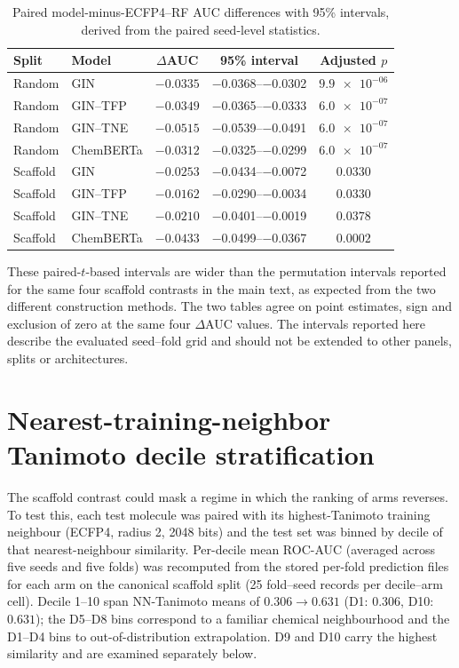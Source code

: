 \documentclass[11pt,a4paper]{article}
\begin{document}
\begin{table}[h]
\centering
\caption{Paired model-minus-ECFP4--RF AUC differences with 95\% intervals, derived from the paired seed-level statistics.}
\label{tab:s4_paired_ci}
\begin{tabular}{llccc}
\toprule
Split & Model & $\Delta$AUC & 95\% interval & Adjusted $p$ \\
\midrule
Random & GIN & $-\num{0.0335}$ & \numrange{-0.0368}{-0.0302} & $\num{9.9e-06}$ \\
Random & GIN--TFP & $-\num{0.0349}$ & \numrange{-0.0365}{-0.0333} & $\num{6.0e-07}$ \\
Random & GIN--TNE & $-\num{0.0515}$ & \numrange{-0.0539}{-0.0491} & $\num{6.0e-07}$ \\
Random & ChemBERTa & $-\num{0.0312}$ & \numrange{-0.0325}{-0.0299} & $\num{6.0e-07}$ \\
Scaffold & GIN & $-\num{0.0253}$ & \numrange{-0.0434}{-0.0072} & $\num{0.0330}$ \\
Scaffold & GIN--TFP & $-\num{0.0162}$ & \numrange{-0.0290}{-0.0034} & $\num{0.0330}$ \\
Scaffold & GIN--TNE & $-\num{0.0210}$ & \numrange{-0.0401}{-0.0019} & $\num{0.0378}$ \\
Scaffold & ChemBERTa & $-\num{0.0433}$ & \numrange{-0.0499}{-0.0367} & $\num{0.0002}$ \\
\bottomrule
\end{tabular}
\end{table}

These paired-$t$-based intervals are wider than the permutation intervals reported for the same four scaffold contrasts in the main text, as expected from the two different construction methods. The two tables agree on point estimates, sign and exclusion of zero at the same four $\Delta$AUC values. The intervals reported here describe the evaluated seed--fold grid and should not be extended to other panels, splits or architectures.

\section{Nearest-training-neighbor Tanimoto decile stratification}
\label{sec:nn_deciles_si}

The scaffold contrast could mask a regime in which the ranking of arms reverses. To test this, each test molecule was paired with its highest-Tanimoto training neighbour (ECFP4, radius \num{2}, \num{2048} bits) and the test set was binned by decile of that nearest-neighbour similarity. Per-decile mean ROC-AUC (averaged across five seeds and five folds) was recomputed from the stored per-fold prediction files for each arm on the canonical scaffold split (\num{25} fold--seed records per decile--arm cell). Decile \numrange{1}{10} span NN-Tanimoto means of $\num{0.306} \to \num{0.631}$ (D\num{1}: $\num{0.306}$, D\num{10}: $\num{0.631}$); the D\num{5}--D\num{8} bins correspond to a familiar chemical neighbourhood and the D\num{1}--D\num{4} bins to out-of-distribution extrapolation. D\num{9} and D\num{10} carry the highest similarity and are examined separately below.
\end{document}
